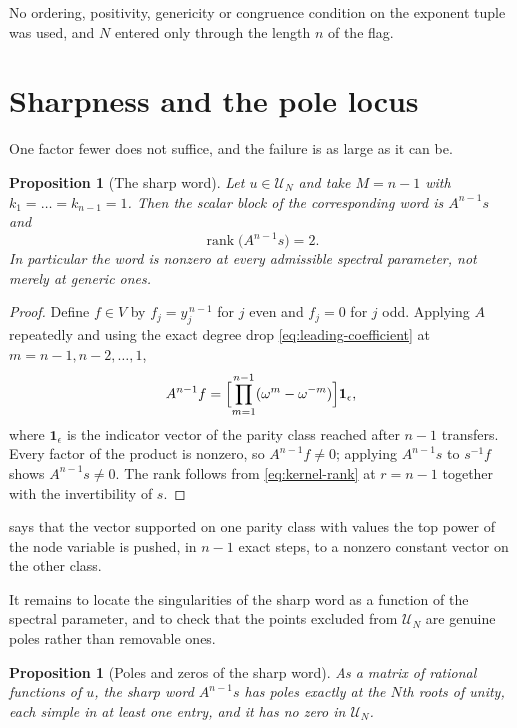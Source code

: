 \documentclass[11pt,reqno]{amsart}
\theoremstyle{plain}
\newtheorem{proposition}[theorem]{Proposition}
\theoremstyle{definition}
\theoremstyle{remark}
\numberwithin{equation}{section}
\begin{document}
No ordering, positivity, genericity or congruence condition on the exponent
tuple was used, and $N$ entered only through the length $n$ of the flag.

\section{Sharpness and the pole locus}
\label{sec:sharpness}

One factor fewer does not suffice, and the failure is as large as it can be.

\begin{proposition}[The sharp word]
\label{prop:sharp}
Let $u\in\mathcal{U}_{N}$ and take $M=n-1$ with $k_{1}=\dots=k_{n-1}=1$. Then
the scalar block of the corresponding word is $A^{n-1}s$ and
\begin{equation*}
  \operatorname{rank}\bigl(A^{n-1}s\bigr)=2 .
\end{equation*}
In particular the word is nonzero at every admissible spectral parameter, not
merely at generic ones.
\end{proposition}

\begin{proof}
Define $f\in V$ by $f_{j}=y_{j}^{\,n-1}$ for $j$ even and $f_{j}=0$ for $j$
odd. Applying $A$ repeatedly and using the exact degree drop
\cref{eq:leading-coefficient} at $m=n-1,n-2,\dots,1$,
\begin{equation}
  A^{n-1}f=\Bigl[\prod_{m=1}^{n-1}(\omega^{m}-\omega^{-m})\Bigr]\mathbf{1}_{\epsilon},
  \label{eq:sharp-output}
\end{equation}
where $\mathbf{1}_{\epsilon}$ is the indicator vector of the parity class
reached after $n-1$ transfers. Every factor of the product is nonzero, so
$A^{n-1}f\ne0$; applying $A^{n-1}s$ to $s^{-1}f$ shows $A^{n-1}s\ne0$. The rank
follows from \cref{eq:kernel-rank} at $r=n-1$ together with the invertibility
of $s$.
\end{proof}

 says that the vector supported on one parity class with
values the top power of the node variable is pushed, in $n-1$ exact steps, to a
nonzero constant vector on the other class.

It remains to locate the singularities of the sharp word as a function of the
spectral parameter, and to check that the points excluded from
$\mathcal{U}_{N}$ are genuine poles rather than removable ones.

\begin{proposition}[Poles and zeros of the sharp word]
\label{prop:poles}
As a matrix of rational functions of $u$, the sharp word $A^{n-1}s$ has poles
exactly at the $N$th roots of unity, each simple in at least one entry, and it
has no zero in $\mathcal{U}_{N}$.
\end{proposition}
\end{document}
